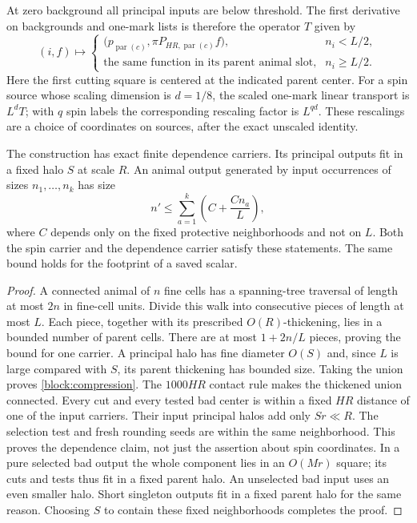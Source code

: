 At zero background all principal inputs are below threshold.  The
first derivative on backgrounds and one-mark lists is therefore the
operator $T$ given by
\begin{equation}
 (i,f)\longmapsto
 \begin{cases}
  \bigl(p_{\operatorname{par}(c)},\pi P_{HR,\operatorname{par}(c)}f\bigr),
       &n_i<L/2,\\
  \text{the same function in its parent animal slot},&n_i\ge L/2.
 \end{cases}
 \label{block:linear}
\end{equation}
Here the first cutting square is centered at the indicated parent
center.  For a spin source whose scaling dimension is $d=1/8$, the
scaled one-mark linear transport is $L^dT$; with $q$ spin labels the
corresponding rescaling factor is $L^{qd}$.  These rescalings are a
choice of coordinates on sources, after the exact unscaled identity.

\begin{lemma}
\label{block:carrier}
The construction has exact finite dependence carriers.  Its principal
outputs fit in a fixed halo $S$ at scale $R$.  An animal output generated
by input occurrences of sizes $n_1,\ldots,n_k$ has size
\begin{equation}
 n'\le\sum_{a=1}^k\left(C+\frac{Cn_a}{L}\right),
 \label{block:compression}
\end{equation}
where $C$ depends only on the fixed protective neighborhoods and not on
$L$.  Both the spin carrier and the dependence carrier satisfy these
statements.  The same bound holds for the footprint of a saved scalar.
\end{lemma}

\begin{proof}
A connected animal of $n$ fine cells has a spanning-tree traversal of
length at most $2n$ in fine-cell units.  Divide this walk into consecutive
pieces of length at most $L$.  Each piece, together with its prescribed
$O(R)$-thickening, lies in a bounded number of parent cells.  There are
at most $1+2n/L$ pieces, proving the bound for one carrier.  A principal
halo has fine diameter $O(S)$ and, since $L$ is large compared with $S$,
its parent thickening has bounded size.  Taking the union proves
\eqref{block:compression}.  The $1000HR$ contact rule makes the thickened
union connected.  Every cut and every tested bad center is within a
fixed $HR$ distance of one of the input carriers.  Their input principal
halos add only $Sr\ll R$.  The selection test and fresh rounding seeds
are within the same neighborhood.  This proves the dependence claim,
not just the assertion about spin coordinates.  In a pure selected bad
output the whole component lies in an $O(Mr)$ square; its cuts and tests
thus fit in a fixed parent halo.  An unselected bad input uses an even
smaller halo.  Short singleton outputs fit in a fixed parent halo for
the same reason.  Choosing $S$ to contain these fixed neighborhoods
completes the proof.
\end{proof}

